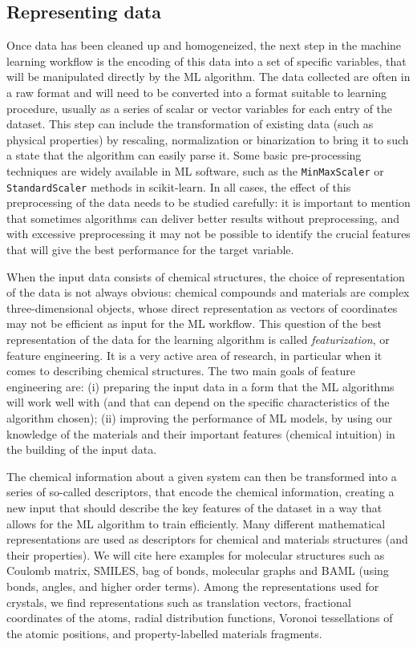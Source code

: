 \documentclass[aip,apm,amsmath,amssymb,reprint]{revtex4-2}
\begin{document}
\subsection{Representing data}

Once data has been cleaned up and homogeneized, the next step in the machine learning workflow is the encoding of this data into a set of specific variables, that will be manipulated directly by the ML algorithm. The data collected are often in a raw format and will need to be converted into a format suitable to learning procedure, usually as a series of scalar or vector variables for each entry of the dataset. This step can include the transformation of existing data (such as physical properties) by rescaling, normalization or binarization to bring it to such a state that the algorithm can easily parse it. Some basic pre-processing techniques are widely available in ML software, such as the \texttt{MinMaxScaler} or \texttt{StandardScaler} methods in scikit-learn.\cite{scikit-learn} In all cases, the effect of this preprocessing of the data needs to be studied carefully: it is important to mention that sometimes algorithms can deliver better results without preprocessing, and with excessive preprocessing it may not be possible to identify the crucial features that will give the best performance for the target variable.

When the input data consists of chemical structures, the choice of representation of the data is not always obvious: chemical compounds and materials are complex three-dimensional objects, whose direct representation as vectors of coordinates may not be efficient as input for the ML workflow. This question of the best representation of the data for the learning algorithm is called \emph{featurization}, or feature engineering. It is a very active area of research, in particular when it comes to describing chemical structures. The two main goals of feature engineering are: (i) preparing the input data in a form that the ML algorithms will work well with (and that can depend on the specific characteristics of the algorithm chosen); (ii) improving the performance of ML models, by using our knowledge of the materials and their important features (chemical intuition) in the building of the input data.

The chemical information about a given system can then be transformed into a series of so-called descriptors, that encode the chemical information, creating a new input that should describe the key features of the dataset in a way that allows for the ML algorithm to train efficiently. Many different mathematical representations are used as descriptors for chemical and materials structures (and their properties). We will cite here examples for molecular structures such as Coulomb matrix,\cite{Rupp2012} SMILES,\cite{Weininger1988} bag of bonds,\cite{Hansen2015} molecular graphs\cite{Faber2017} and BAML (using bonds, angles, and higher order terms)\cite{Huang2016}. Among the representations used for crystals, we find representations such as translation vectors, fractional coordinates of the atoms, radial distribution functions,\cite{Schtt2014} Voronoi tessellations of the atomic positions,\cite{Ward2017} and property-labelled materials fragments.\cite{Isayev2017}
\end{document}
